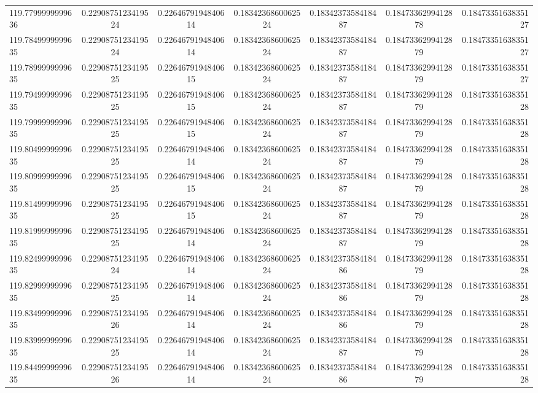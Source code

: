 \begin{tabular}{ l | c | c | c | c | c | r }
119.7799999999636  & 0.2290875123419524  & 0.2264679194840614  & 0.1834236860062524  & 0.1834237358418487  & 0.1847336299412878  & 0.1847335163835127 \\
119.7849999999635  & 0.2290875123419524  & 0.2264679194840614  & 0.1834236860062524  & 0.1834237358418487  & 0.1847336299412879  & 0.1847335163835127 \\
119.7899999999635  & 0.2290875123419525  & 0.2264679194840615  & 0.1834236860062524  & 0.1834237358418487  & 0.1847336299412879  & 0.1847335163835127 \\
119.7949999999635  & 0.2290875123419525  & 0.2264679194840615  & 0.1834236860062524  & 0.1834237358418487  & 0.1847336299412879  & 0.1847335163835128 \\
119.7999999999635  & 0.2290875123419525  & 0.2264679194840615  & 0.1834236860062524  & 0.1834237358418487  & 0.1847336299412879  & 0.1847335163835128 \\
119.8049999999635  & 0.2290875123419525  & 0.2264679194840614  & 0.1834236860062524  & 0.1834237358418487  & 0.1847336299412879  & 0.1847335163835128 \\
119.8099999999635  & 0.2290875123419525  & 0.2264679194840615  & 0.1834236860062524  & 0.1834237358418487  & 0.1847336299412879  & 0.1847335163835128 \\
119.8149999999635  & 0.2290875123419525  & 0.2264679194840615  & 0.1834236860062524  & 0.1834237358418487  & 0.1847336299412879  & 0.1847335163835128 \\
119.8199999999635  & 0.2290875123419525  & 0.2264679194840614  & 0.1834236860062524  & 0.1834237358418487  & 0.1847336299412879  & 0.1847335163835128 \\
119.8249999999635  & 0.2290875123419524  & 0.2264679194840614  & 0.1834236860062524  & 0.1834237358418486  & 0.1847336299412879  & 0.1847335163835128 \\
119.8299999999635  & 0.2290875123419525  & 0.2264679194840614  & 0.1834236860062524  & 0.1834237358418486  & 0.1847336299412879  & 0.1847335163835128 \\
119.8349999999635  & 0.2290875123419526  & 0.2264679194840614  & 0.1834236860062524  & 0.1834237358418486  & 0.1847336299412879  & 0.1847335163835128 \\
119.8399999999635  & 0.2290875123419525  & 0.2264679194840614  & 0.1834236860062524  & 0.1834237358418487  & 0.1847336299412879  & 0.1847335163835128 \\
119.8449999999635  & 0.2290875123419526  & 0.2264679194840614  & 0.1834236860062524  & 0.1834237358418486  & 0.1847336299412879  & 0.1847335163835128 \\

\end{tabular}
